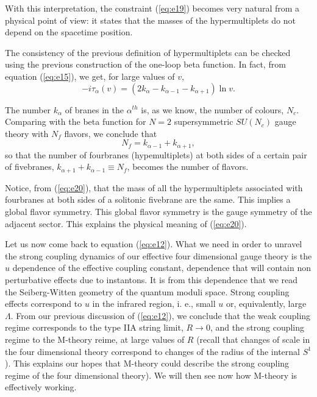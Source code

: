 With this interpretation, the constraint (\ref{eq:e19}) becomes
very natural from a physical point of view: it states that the
masses of the hypermultiplets do not depend on the spacetime
position.
  
The consistency of the previous definition of hypermultiplets can
be checked using the previous construction of the one-loop beta
function. In fact, from equation (\ref{eq:e15}), we get, for
large values of $v$,
\begin{equation}
-i \tau_{\alpha}(v) =  (2
k_{\alpha}-k_{\alpha-1}-k_{\alpha+1})\ln v.
\label{eq:e21}
\end{equation}
  
The number $k_{\alpha}$ of branes in the $\alpha^{th}$ is, as we
know, the number of colours, $N_c$. Comparing with the beta
function for $N=2$ supersymmetric $SU(N_c)$ gauge theory with
$N_f$ flavors, we conclude that
\begin{equation}
N_f = k_{\alpha-1}+ k_{\alpha+1},
\label{eq:e22}
\end{equation}
so that the number of fourbranes (hypemultiplets) at both sides
of a certain pair of fivebranes, $k_{\alpha+1}+k_{\alpha-1}
\equiv N_f$, becomes the number of flavors. 
  
Notice, from (\ref{eq:e20}), that the mass of all the
hypermultiplets associated with fourbranes at both sides of a
solitonic fivebrane are the same. This implies a global flavor
symmetry. This global flavor symmetry is the gauge symmetry of
the adjacent sector. This explains the physical meaning of
(\ref{eq:e20}).

  
Let us now come back to equation (\ref{eq:e12}). What we need in
order to unravel the strong coupling dynamics of our effective
four dimensional gauge theory is the $u$ dependence of the
effective coupling constant, dependence that will contain non
perturbative effects due to instantons. It is from this
dependence that we read the Seiberg-Witten geometry of the
quantum moduli space. Strong coupling effects correspond to $u$
in the infrared region, i. e., small $u$ or, equivalently, large
$\Lambda$. From our previous discussion of (\ref{eq:e12}), we
conclude that the weak coupling regime corresponds to the type
IIA string limit, $R \rightarrow 0$, and the strong coupling
regime to the M-theory reime, at large values of $R$ (recall that
changes of scale in the four dimensional theory correspond to
changes of the radius of the internal $S^1$). This explains our
hopes that M-theory could describe the strong coupling regime of
the four dimensional theory). We will then see now how M-theory
is effectively working.

